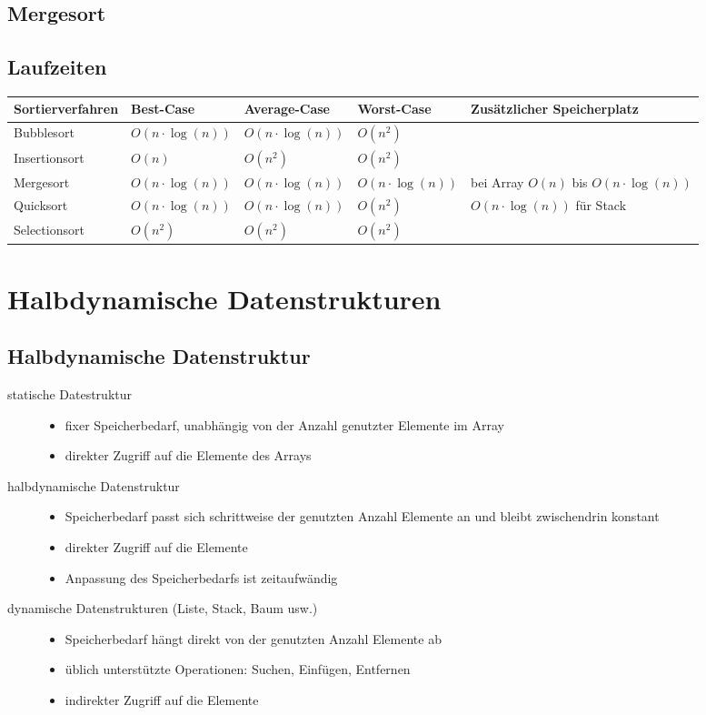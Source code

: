 \documentclass[a4paper,10pt]{article}
\begin{document}
\newpage
\subsection{Mergesort}


\subsection{Laufzeiten}
\begin{tabular}{|l|l|l|l|l|}
\hline
Sortierverfahren&Best-Case&Average-Case&Worst-Case&Zus\"atzlicher Speicherplatz\\\hline\hline
Bubblesort&$O(n\cdot \log(n))$&$O(n\cdot \log(n))$&$O(n^2)$&\\\hline
Insertionsort&$O(n)$&$O(n^2)$&$O(n^2)$&\\\hline
Mergesort&$O(n\cdot \log(n))$&$O(n\cdot \log(n))$&$O(n\cdot \log(n))$&bei Array $O(n)$ bis $O(n\cdot \log(n))$\\\hline
Quicksort&$O(n\cdot \log(n))$&$O(n\cdot \log(n))$&$O(n^2)$&$O(n\cdot \log(n))$ f\"ur Stack\\\hline
Selectionsort&$O(n^2)$&$O(n^2)$&$O(n^2)$&\\\hline
\end{tabular}

\pagebreak
\section{Halbdynamische Datenstrukturen}
\subsection{Halbdynamische Datenstruktur}
\begin{description}
\item[statische Datestruktur]
	\begin{itemize}
		\item fixer Speicherbedarf, unabh\"angig von der Anzahl genutzter Elemente im Array
		\item direkter Zugriff auf die Elemente des Arrays
	\end{itemize}
\item[halbdynamische Datenstruktur]
	\begin{itemize}
	\item Speicherbedarf passt sich schrittweise der genutzten Anzahl Elemente an und bleibt zwischendrin konstant
	\item direkter Zugriff auf die Elemente
	\item Anpassung des Speicherbedarfs ist zeitaufw\"andig
	\end{itemize}
\item[dynamische Datenstrukturen (Liste, Stack, Baum usw.)]
	\begin{itemize}
	\item Speicherbedarf h\"angt direkt von der genutzten Anzahl Elemente ab
	\item \"ublich unterst\"utzte Operationen: Suchen, Einf\"ugen, Entfernen
	\item indirekter Zugriff auf die Elemente
	\end{itemize}
\end{description}
\end{document}
